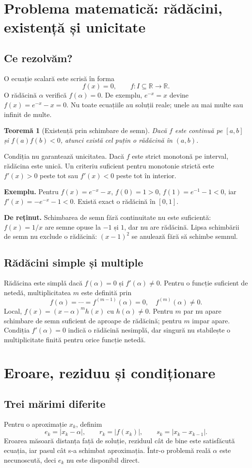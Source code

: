 \documentclass[11pt,a4paper]{article}
\newtheorem{theorem}{Teoremă}[section]
\newcommand{\R}{\mathbb R}
\newcommand{\important}[1]{\par\smallskip\textbf{De reținut.} #1\par\smallskip}
\begin{document}
\section{Problema matematică: rădăcini, existență și unicitate}
\subsection{Ce rezolvăm?}
O ecuație scalară este scrisă în forma
\[
f(x)=0,\qquad f:I\subseteq\R\longrightarrow\R.
\]
O rădăcină $\alpha$ verifică $f(\alpha)=0$. De exemplu, $e^{-x}=x$ devine $f(x)=e^{-x}-x=0$. Nu toate ecuațiile au soluții reale; unele au mai multe sau infinit de multe.

\begin{theorem}[Existență prin schimbare de semn]
Dacă $f$ este continuă pe $[a,b]$ și $f(a)f(b)<0$, atunci există cel puțin o rădăcină în $(a,b)$.
\end{theorem}
Condiția nu garantează unicitatea. Dacă $f$ este strict monotonă pe interval, rădăcina este unică. Un criteriu suficient pentru monotonie strictă este $f'(x)>0$ peste tot sau $f'(x)<0$ peste tot în interior.

\textbf{Exemplu.} Pentru $f(x)=e^{-x}-x$, $f(0)=1>0$, $f(1)=e^{-1}-1<0$, iar $f'(x)=-e^{-x}-1<0$. Există exact o rădăcină în $[0,1]$.

\important{Schimbarea de semn fără continuitate nu este suficientă: $f(x)=1/x$ are semne opuse la $-1$ și $1$, dar nu are rădăcină. Lipsa schimbării de semn nu exclude o rădăcină: $(x-1)^2$ se anulează fără să schimbe semnul.}

\subsection{Rădăcini simple și multiple}
Rădăcina este simplă dacă $f(\alpha)=0$ și $f'(\alpha)\ne0$. Pentru o funcție suficient de netedă, multiplicitatea $m$ este definită prin
\[
f(\alpha)=\cdots=f^{(m-1)}(\alpha)=0,\quad f^{(m)}(\alpha)\ne0.
\]
Local, $f(x)=(x-\alpha)^m h(x)$ cu $h(\alpha)\ne0$. Pentru $m$ par nu apare schimbare de semn suficient de aproape de rădăcină; pentru $m$ impar apare. Condiția $f'(\alpha)=0$ indică o rădăcină nesimplă, dar singură nu stabilește o multiplicitate finită pentru orice funcție netedă.

\section{Eroare, reziduu și condiționare}
\subsection{Trei mărimi diferite}
Pentru o aproximație $x_k$, definim
\[
e_k=|x_k-\alpha|,\qquad r_k=|f(x_k)|,\qquad s_k=|x_k-x_{k-1}|.
\]
Eroarea măsoară distanța față de soluție, reziduul cât de bine este satisfăcută ecuația, iar pasul cât s-a schimbat aproximația. Într-o problemă reală $\alpha$ este necunoscută, deci $e_k$ nu este disponibil direct.
\end{document}

